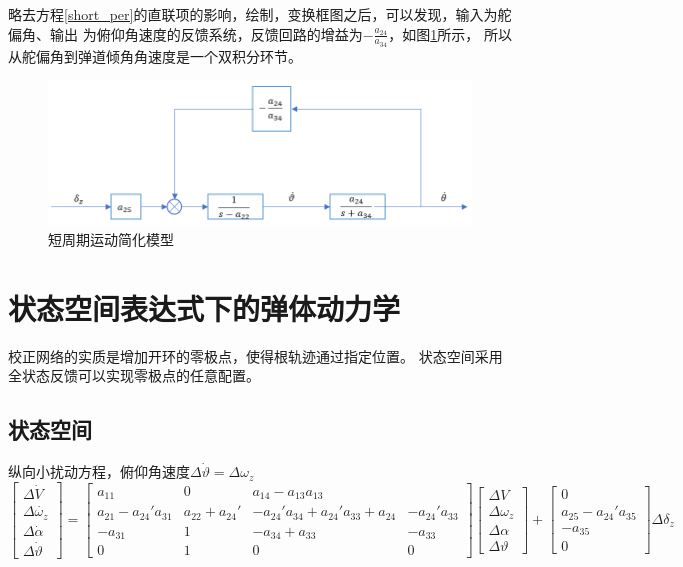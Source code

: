 \begin{enumerate}[1)]
    {\kaishu 略去方程\ref{short_per}的直联项的影响，绘制，变换框图之后，可以发现，输入为舵偏角、输出
    为俯仰角速度的反馈系统，反馈回路的增益为$-\frac{a_{24}}{a_{34}}$，如图\ref{short_per_model}所示，
    所以从舵偏角到弹道倾角角速度是一个双积分环节。
    }
    \begin{figure}[H]
        \centering
        \includegraphics[scale = 0.7]{pictures/chapter8/1}
        \caption{短周期运动简化模型}
        \label{short_per_model}
    \end{figure}
\end{enumerate}
\section{状态空间表达式下的弹体动力学}
校正网络的实质是增加开环的零极点，使得根轨迹通过指定位置。
状态空间采用全状态反馈可以实现零极点的任意配置。
\subsection{状态空间}
纵向小扰动方程，俯仰角速度$\Delta\dot{\vartheta}=\Delta\omega_z$
\begin{equation*}
    \left[
        \begin{smallmatrix}
            \Delta\dot{V}\\
            \Delta\dot{\omega_z}\\
            \Delta\dot{\alpha}\\
            \Delta\dot{\vartheta}
        \end{smallmatrix}
    \right] = 
    \left[
    \begin{smallmatrix}
        a_{11} & 0 &a_{14}-a_{13} a_{13} \\
        a_{21}-a_{24}'a_{31} &a_{22}+a_{24}' &-a_{24}'a_{34}+a_{24}'a_{33}+a_{24} &-a_{24}'a_{33}\\
        -a_{31} &1 &-a_{34}+a_{33} &-a_{33}\\
        0 &1 &0 &0
    \end{smallmatrix}
    \right]
    \left[
    \begin{smallmatrix}
        \Delta{V}\\
        \Delta{\omega_z}\\
        \Delta{\alpha}\\
        \Delta{\vartheta}
    \end{smallmatrix}
    \right]+
    \left[
    \begin{smallmatrix}
        0\\
        a_{25}-a_{24}'a_{35}\\
        -a_{35}\\
        0
    \end{smallmatrix}
    \right]
    \Delta\delta_z
\end{equation*}

